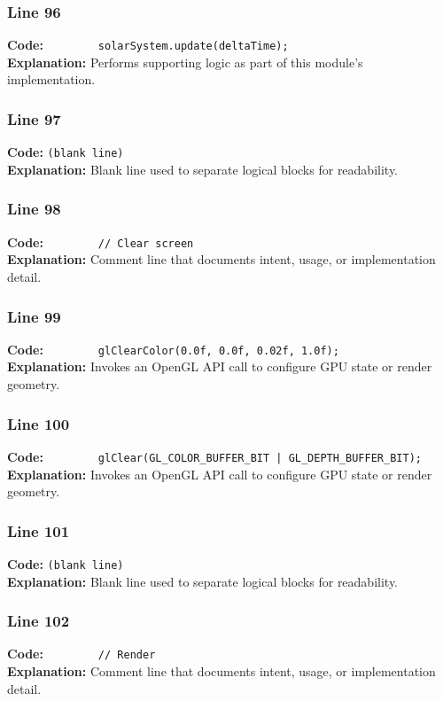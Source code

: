 \documentclass[11pt,a4paper]{article}
\begin{document}
\subsubsection*{Line 96}
\textbf{Code:} \verb|        solarSystem.update(deltaTime);|\\
\textbf{Explanation:} Performs supporting logic as part of this module's implementation.

\subsubsection*{Line 97}
\textbf{Code:} \texttt{(blank line)}\\
\textbf{Explanation:} Blank line used to separate logical blocks for readability.

\subsubsection*{Line 98}
\textbf{Code:} \verb|        // Clear screen|\\
\textbf{Explanation:} Comment line that documents intent, usage, or implementation detail.

\subsubsection*{Line 99}
\textbf{Code:} \verb|        glClearColor(0.0f, 0.0f, 0.02f, 1.0f);|\\
\textbf{Explanation:} Invokes an OpenGL API call to configure GPU state or render geometry.

\subsubsection*{Line 100}
\textbf{Code:} \verb!        glClear(GL_COLOR_BUFFER_BIT | GL_DEPTH_BUFFER_BIT);!\\
\textbf{Explanation:} Invokes an OpenGL API call to configure GPU state or render geometry.

\subsubsection*{Line 101}
\textbf{Code:} \texttt{(blank line)}\\
\textbf{Explanation:} Blank line used to separate logical blocks for readability.

\subsubsection*{Line 102}
\textbf{Code:} \verb|        // Render|\\
\textbf{Explanation:} Comment line that documents intent, usage, or implementation detail.
\end{document}
